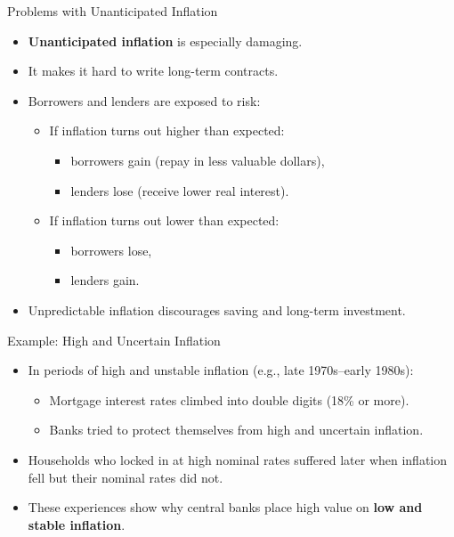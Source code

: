 \documentclass[aspectratio=169]{beamer}
\begin{document}
\begin{frame}{Problems with Unanticipated Inflation}
\transfade
\begin{itemize}[<+->]
  \item \textbf{Unanticipated inflation} is especially damaging.
  \item It makes it hard to write long-term contracts.
  \item Borrowers and lenders are exposed to risk:
  \begin{itemize}[<+->]
    \item If inflation turns out higher than expected:
    \begin{itemize}[<+->]
      \item borrowers gain (repay in less valuable dollars),
      \item lenders lose (receive lower real interest).
    \end{itemize}
    \item If inflation turns out lower than expected:
    \begin{itemize}[<+->]
      \item borrowers lose,
      \item lenders gain.
    \end{itemize}
  \end{itemize}
  \item Unpredictable inflation discourages saving and long-term investment.
\end{itemize}
\end{frame}

\begin{frame}{Example: High and Uncertain Inflation}
\transfade
\begin{itemize}[<+->]
  \item In periods of high and unstable inflation (e.g., late 1970s–early 1980s):
  \begin{itemize}[<+->]
    \item Mortgage interest rates climbed into double digits (18\% or more).
    \item Banks tried to protect themselves from high and uncertain inflation.
  \end{itemize}
  \item Households who locked in at high nominal rates suffered later when inflation fell but their nominal rates did not.
  \item These experiences show why central banks place high value on \textbf{low and stable inflation}.
\end{itemize}
\end{frame}
\end{document}
